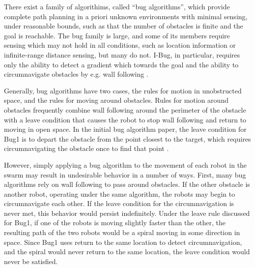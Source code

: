 There exist a family of algorithims, called ``bug algorithms'', which provide complete path planning in a priori unknown environments with minimal sensing, under reasonable bounds, such as that the number of obstacles is finite and the goal is reachable. The bug family is large, and some of its members require sensing which may not hold in all conditions, such as location information or infinite-range distance sensing, but many do not. I-Bug, in particular, requires only the ability to detect a gradient which towards the goal and the ability to circumnavigate obstacles by e.g. wall following \citep{taylor2009bug}.

Generally, bug algorithms have two cases, the rules for motion in unobstructed space, and the rules for moving around obstacles. 
Rules for motion around obstacles frequently combine wall following around the perimeter of the obstacle with a leave condition that causes the robot to stop wall following and return to moving in open space. 
In the initial bug algorithm paper, the leave condition for Bug1 is to depart the obstacle from the point closest to the target, which requires circumnavigating the obstacle once to find that point \citep{lumelsky1987path}.

However, simply applying a bug algorithm to the movement of each robot in the swarm may result in undesirable behavior in a number of ways. 
First, many bug algorithms rely on wall following to pass around obstacles. 
If the other obstacle is another robot, operating under the same algorithm, the robots may begin to circumnavigate each other. 
If the leave condition for the circumnavigation is never met, this behavior would persist indefinitely. 
Under the leave rule discussed for Bug1, if one of the robots is moving slightly faster than the other, the resulting path of the two robots would be a spiral moving in some direction in space. 
Since Bug1 uses return to the same location to detect circumnavigation, and the spiral would never return to the same location, the leave condition would never be satisfied.


